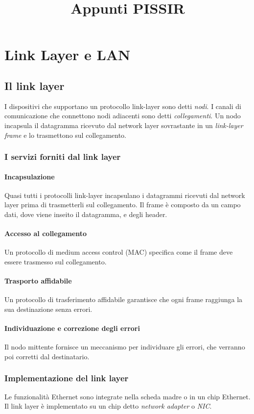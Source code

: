 \documentclass[11pt]{book}
\title{Appunti PISSIR}
\begin{document}
\chapter{Link Layer e LAN}
\section{Il link layer}
I dispositivi che supportano un protocollo link-layer sono detti \textit{nodi}. I canali di comunicazione che connettono
nodi adiacenti sono detti \textit{collegamenti}. Un nodo incapsula il datagramma ricevuto dal network layer sovrastante 
in un \textit{link-layer frame} e lo trasmettono sul collegamento.
\subsection{I servizi forniti dal link layer}
\subsubsection{Incapsulazione}
Quasi tutti i protocolli link-layer incapsulano i datagrammi ricevuti dal network layer prima di trasmetterli sul collegamento.
Il frame è composto da un campo dati, dove viene inseito il datagramma, e degli header.
\subsubsection{Accesso al collegamento}
Un protocollo di medium access control (MAC) specifica come il frame deve essere trasmesso sul collegamento. 
\subsubsection{Trasporto affidabile}
Un protocollo di trasferimento affidabile garantisce che ogni frame raggiunga la sua destinazione senza errori.
\subsubsection{Individuazione e correzione degli errori}
Il nodo mittente fornisce un meccanismo per individuare gli errori, che verranno poi corretti dal destinatario.
\subsection{Implementazione del link layer}
Le funzionalità Ethernet sono integrate nella scheda madre o in un chip Ethernet. Il link layer è implementato su un chip 
detto \textit{network adapter} o \textit{NIC}. 
\end{document}
